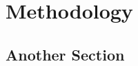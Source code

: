 
\chapter{Methodology}
\label{chap:otherchap}


\Blindtext[2]

\section{Another Section}
\Blindtext[1]
